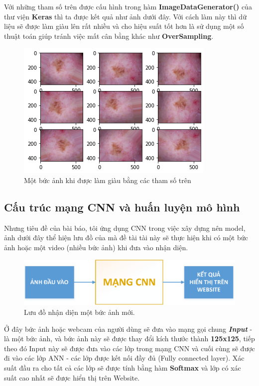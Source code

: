 \documentclass[12pt,a4paper]{article}
\begin{document}
	\noindent
	Với những tham số trên được cấu hình trong hàm \textbf{ImageDataGenerator()} của thư viện \textbf{Keras} thì ta được kết quả như ảnh dưới đây. Với cách làm này thì dữ liệu sẽ được làm giàu lên rất nhiều và cho hiệu suất tốt hơn là sử dụng một số thuật toán giúp tránh việc mất cân bằng khác như \textbf{OverSampling}.
	\begin{figure}[h!]
		\centering
		\includegraphics[width=0.5\linewidth]{./images/AnhLamGiau.png}
		\caption{Một bức ảnh khi được làm giàu bằng các tham số trên}
		\label{fig:AnhLamGiau}
	\end{figure}
	
	\subsection{Cấu trúc mạng CNN và huấn luyện mô hình}
	
	Nhưng tiêu đề của bài báo, tôi ứng dụng CNN trong việc xây dựng nên model, ảnh dưới đây thể hiện lưu đồ của mà đề tài tài này sẽ thực hiện khi có một bức ảnh hoặc một video (nhiều bức ảnh) khi đưa vào nhận diện.
	
	\begin{figure}[h!]
		\centering
		\includegraphics[width=0.8\linewidth]{./images/soDo_1.eps}
		\caption{Lưu đồ nhận diện một bức ảnh mới.}
		\label{fig:soDo1}
	\end{figure}

	\noindent
	Ở đây bức ảnh hoặc webcam của người dùng sẽ đưa vào mạng gọi chung \textit{\textbf{Input}} - là một bức ảnh, và bức ảnh này sẽ được thay đổi kích thước thành \textbf{125x125}, tiếp theo đó Input này sẽ được đưa vào các lớp trong mạng CNN và cuối cùng sẽ được đi vào các lớp ANN - các lớp được kết nối đầy đủ (Fully connected layer). Xác suất đầu ra cho tất cả các lớp sẽ được tính bằng hàm \textbf{Softmax} và lớp có xác suất cao nhất sẽ được hiển thị trên Website.\\
	
\end{document}

